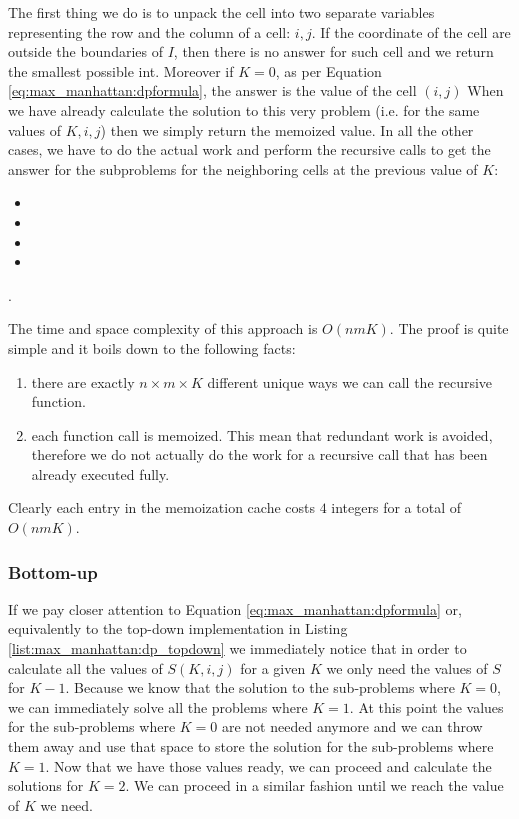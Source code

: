 The first thing we do is to unpack the cell into two separate variables representing the row and the
column of a cell: $i,j$. If the coordinate of the cell are outside the boundaries of $I$, then there
is no answer for such cell and we return the smallest possible int. Moreover if $K=0$, as per
Equation \ref{eq:max_manhattan:dpformula}, the answer is the value of the cell $(i,j)$ When we have
already calculate the solution to this very problem (i.e. for the same values of $K,i,j$) then we
simply return the memoized value. In all the other cases, we have to do the actual work and perform
the recursive calls to get the answer for the subproblems for the neighboring cells at the previous
value of $K$:
\begin{itemize}
	\item {}
	\item {}
	\item {}
	\item {} \end{itemize}.

The time and space complexity of this approach is $O(nmK)$. The proof is quite simple and it boils
down to the following facts:
\begin{enumerate}
	\item there are exactly $n\times m \times K$ different unique ways we can call the recursive
	function.
	\item each function call is memoized. This mean that redundant work is avoided, therefore we do
	not actually do the work for a recursive call that has been already executed fully.
\end{enumerate}
Clearly each entry in the memoization cache costs $4$ integers for a total of $O(nmK)$.





\subsubsection{Bottom-up}
If we pay closer attention to Equation \ref{eq:max_manhattan:dpformula} or, equivalently to the top-down implementation in Listing \ref{list:max_manhattan:dp_topdown} 
we immediately notice that in order to calculate all the values of $S(K,i,j)$ for a given $K$ we only need the values of $S$ for $K-1$.
Because we know that the solution to the sub-problems where $K=0$, we can immediately solve all the problems where $K=1$.
At this point the values for the sub-problems where $K=0$ are not needed anymore and we can throw them away and use that space to store the solution for the sub-problems where $K=1$.
Now that we have those values ready, we can proceed and calculate the solutions for $K=2$. We can proceed in a similar fashion until we reach the value of $K$ we need.

